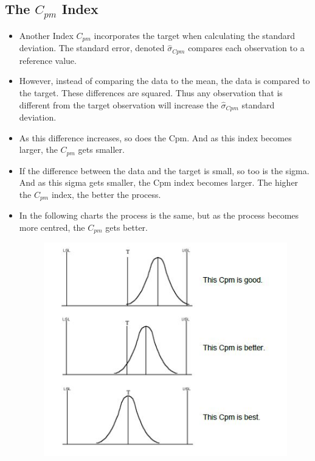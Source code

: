 \documentclass[MASTER-SPC.tex]{subfiles}
\begin{document}
					\subsection*{The  $C_{pm}$ Index}
\begin{itemize}
\item	Another Index $C_{pm}$ incorporates the target when calculating the standard deviation. The standard error, denoted $\hat{\sigma}_{Cpm}$ compares each observation to a reference value. \item However, instead of comparing the data to the mean, the data is compared to the target. These differences are squared. Thus any observation that is different from the target observation will increase the $\hat{\sigma}_{Cpm}$  standard deviation.
\item As this difference increases, so does the Cpm. And as this index becomes larger, the $C_{pm}$ gets smaller. 
	
\item If the difference between the data and the target is small, so too is the sigma. And as this sigma gets smaller, the Cpm index becomes larger. The higher the $C_{pm}$ index, the better the process.
	
\item In the following charts the process is the same, but as the process becomes more centred, the $C_{pm}$ gets better.
	\begin{figure}[h!]
		\centering
		\includegraphics[width=0.7\linewidth]{proccapindices/image6}
	\end{figure}
\end{itemize}
\newpage				
			
\end{document}
